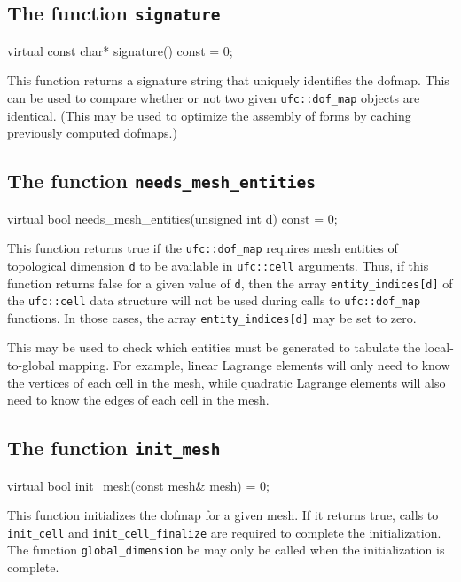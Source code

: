 \subsection{The function \texttt{signature}}

\begin{code}
virtual const char* signature() const = 0;
\end{code}

This function returns a signature string that uniquely identifies the
dofmap. This can be used to compare whether or not two given
\texttt{ufc::dof\_map} objects are identical. (This may be used to
optimize the assembly of forms by caching previously computed
dofmaps.)

\subsection{The function \texttt{needs\_mesh\_entities}}

\begin{code}
virtual bool needs_mesh_entities(unsigned int d) const = 0;
\end{code}

This function returns true if the \texttt{ufc::dof\_map} requires mesh
entities of topological dimension \texttt{d} to be available in
\texttt{ufc::cell} arguments. Thus, if this function returns false for
a given value of \texttt{d}, then the array
\texttt{entity\_indices[d]} of the \texttt{ufc::cell} data structure
will not be used during calls to \texttt{ufc::dof\_map} functions. In
those cases, the array \texttt{entity\_indices[d]} may be set to zero.

This may be used to check which entities must be generated to tabulate
the local-to-global mapping. For example, linear Lagrange elements
will only need to know the vertices of each cell in the mesh, while
quadratic Lagrange elements will also need to know the edges of each
cell in the mesh.

\subsection{The function \texttt{init\_mesh}}

\begin{code}
virtual bool init_mesh(const mesh& mesh) = 0;
\end{code}

This function initializes the dofmap for a given mesh. If it returns
true, calls to \texttt{init\_cell} and \texttt{init\_cell\_finalize}
are required to complete the initialization. The function
\texttt{global\_dimension} be may only be called when the
initialization is complete.

